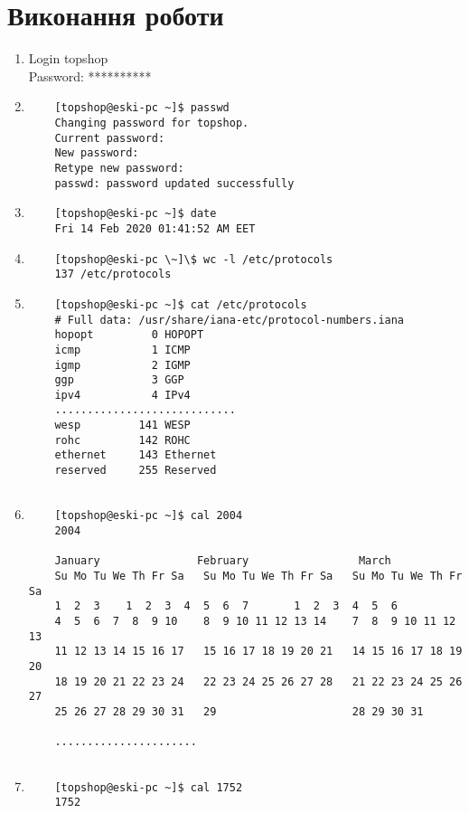 \documentclass{article}
\begin{document}
\section*{Виконання роботи}
\begin{enumerate}
	\item Login topshop\\Password: **********
	\item \begin{verbatim}
	[topshop@eski-pc ~]$ passwd
	Changing password for topshop.
	Current password: 
	New password: 
	Retype new password: 
	passwd: password updated successfully
	\end{verbatim}
	\item \begin{verbatim}
	[topshop@eski-pc ~]$ date
	Fri 14 Feb 2020 01:41:52 AM EET
	\end{verbatim}
	\item \begin{verbatim}
	[topshop@eski-pc \~]\$ wc -l /etc/protocols 
	137 /etc/protocols
	\end{verbatim}
	
	\item \begin{verbatim}
	[topshop@eski-pc ~]$ cat /etc/protocols 
	# Full data: /usr/share/iana-etc/protocol-numbers.iana
	hopopt         0 HOPOPT
	icmp           1 ICMP
	igmp           2 IGMP
	ggp            3 GGP
	ipv4           4 IPv4
	............................
	wesp         141 WESP
	rohc         142 ROHC
	ethernet     143 Ethernet
	reserved     255 Reserved
	
	\end{verbatim}
	\item \begin{verbatim}
	[topshop@eski-pc ~]$ cal 2004
	2004                               
	
	January               February                 March       
	Su Mo Tu We Th Fr Sa   Su Mo Tu We Th Fr Sa   Su Mo Tu We Th Fr Sa
	1  2  3    1  2  3  4  5  6  7       1  2  3  4  5  6
	4  5  6  7  8  9 10    8  9 10 11 12 13 14    7  8  9 10 11 12 13
	11 12 13 14 15 16 17   15 16 17 18 19 20 21   14 15 16 17 18 19 20
	18 19 20 21 22 23 24   22 23 24 25 26 27 28   21 22 23 24 25 26 27
	25 26 27 28 29 30 31   29                     28 29 30 31         
	
	......................
	
	\end{verbatim}
	\clearpage
	\item \begin{verbatim}
	[topshop@eski-pc ~]$ cal 1752
	1752                               
	

\end{verbatim}
\end{enumerate}
\end{document}
